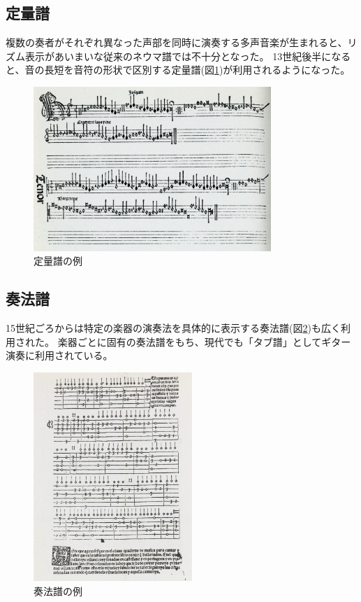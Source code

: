 \subsection{定量譜}
複数の奏者がそれぞれ異なった声部を同時に演奏する多声音楽が生まれると、リズム表示があいまいな従来のネウマ譜では不十分となった。
13世紀後半になると、音の長短を音符の形状で区別する定量譜(図\ref{teiryo})が利用されるようになった。

\begin{figure}[H]
    \centering
    \includegraphics[width=9cm]{images/teiryo.png}
    \caption{定量譜の例}
    \label{teiryo}
\end{figure}

\subsection{奏法譜}
15世紀ごろからは特定の楽器の演奏法を具体的に表示する奏法譜(図\ref{tab})も広く利用された。
楽器ごとに固有の奏法譜をもち、現代でも「タブ譜」としてギター演奏に利用されている。

\begin{figure}[H]
    \centering
    \includegraphics[width=6cm]{images/tab.png}
    \caption{奏法譜の例}
    \label{tab}
\end{figure}

